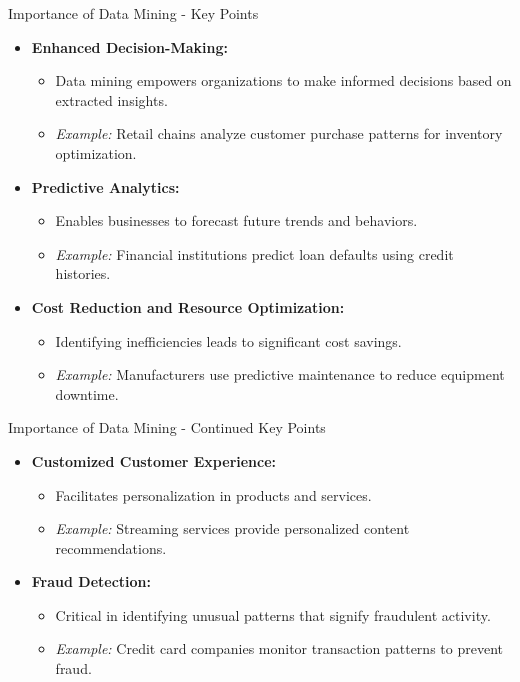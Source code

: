 \documentclass[aspectratio=169]{beamer}
\begin{document}
\begin{frame}[fragile]{Importance of Data Mining - Key Points}
    \begin{itemize}
        \item \textbf{Enhanced Decision-Making:} 
            \begin{itemize}
                \item Data mining empowers organizations to make informed decisions based on extracted insights.
                \item \textit{Example:} Retail chains analyze customer purchase patterns for inventory optimization.
            \end{itemize}
        
        \item \textbf{Predictive Analytics:} 
            \begin{itemize}
                \item Enables businesses to forecast future trends and behaviors.
                \item \textit{Example:} Financial institutions predict loan defaults using credit histories.
            \end{itemize}

        \item \textbf{Cost Reduction and Resource Optimization:} 
            \begin{itemize}
                \item Identifying inefficiencies leads to significant cost savings.
                \item \textit{Example:} Manufacturers use predictive maintenance to reduce equipment downtime.
            \end{itemize}
    \end{itemize}
\end{frame}

\begin{frame}[fragile]{Importance of Data Mining - Continued Key Points}
    \begin{itemize}
        \item \textbf{Customized Customer Experience:} 
            \begin{itemize}
                \item Facilitates personalization in products and services.
                \item \textit{Example:} Streaming services provide personalized content recommendations.
            \end{itemize}

        \item \textbf{Fraud Detection:} 
            \begin{itemize}
                \item Critical in identifying unusual patterns that signify fraudulent activity.
                \item \textit{Example:} Credit card companies monitor transaction patterns to prevent fraud.
            \end{itemize}
    \end{itemize}
\end{frame}
\end{document}
